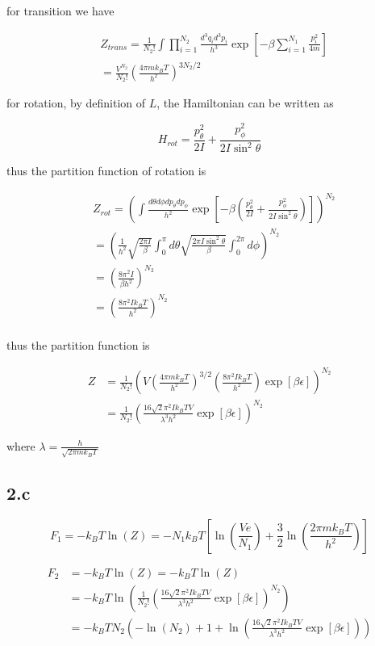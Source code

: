 \documentclass{article}
\begin{document}
for transition we have

$$
\begin{aligned}
    &Z_{trans} = \frac{1}{N_2!}\int \prod_{i=1}^{N_2} \frac{d^3q_i d^3p_i}{h^3} \exp[-\beta\sum_{i=1}^{N_1}\frac{p_i^2}{4m}]\\
    &= \frac{V^{N_2}}{N_2!} (\frac{4\pi m k_B T}{h^2})^{3N_2/2}
\end{aligned}
$$

for rotation, by definition of $L$, the Hamiltonian can be written as

$$
H_{rot} = \frac{p_{\theta}^2}{2I} + \frac{p_{\phi}^2}{2I\sin^2\theta}
$$

thus the partition function of rotation is

$$
\begin{aligned}
    &Z_{rot} = (\int \frac{d\theta d\phi dp_{\theta} dp_{\phi}}{h^2} \exp[-\beta (\frac{p_{\theta}^2}{2I} + \frac{p_{\phi}^2}{2I\sin^2\theta})])^{N_2}\\
    &= (\frac{1}{h^2} \sqrt{\frac{2\pi I}{\beta}} \int_{0}^{\pi} d\theta \sqrt{\frac{2\pi I \sin^2\theta}{\beta}} \int_{0}^{2\pi} d\phi)^{N_2}\\
    &= (\frac{8\pi^2 I}{\beta h^2})^{N_2}\\
    &= (\frac{8\pi^2 I k_B T}{h^2})^{N_2}\\
\end{aligned}
$$

thus the partition function is

$$
\begin{aligned}
    Z &= \frac{1}{N_2!} (V(\frac{4\pi m k_B T}{h^2})^{3/2} (\frac{8\pi^2 I k_B T}{h^2}) \exp[\beta\epsilon])^{N_2}\\
    &= \frac{1}{N_2!} (\frac{16\sqrt{2}\pi^2 I k_B T V}{\lambda^3 h^2} \exp[\beta\epsilon])^{N_2}
\end{aligned}
$$

where $\lambda = \frac{h}{\sqrt{2\pi mk_B T}}$

\subsection*{2.c}

$$
F_1 = -k_B T \ln(Z) = -N_1 k_B T [\ln(\frac{Ve}{N_1}) + \frac{3}{2}\ln(\frac{2\pi mk_B T}{h^2})]
$$

$$
\begin{aligned}
    F_2 &= -k_B T \ln(Z) =-k_B T \ln(Z)\\
    &= -k_B T \ln(\frac{1}{N_2!} (\frac{16\sqrt{2}\pi^2 I k_B T V}{\lambda^3 h^2} \exp[\beta\epsilon])^{N_2})\\
    &= -k_B T N_2 (-\ln(N_2) + 1 + \ln(\frac{16\sqrt{2}\pi^2 I k_B T V}{\lambda^3 h^2} \exp[\beta\epsilon]))
\end{aligned}
$$
\end{document}
